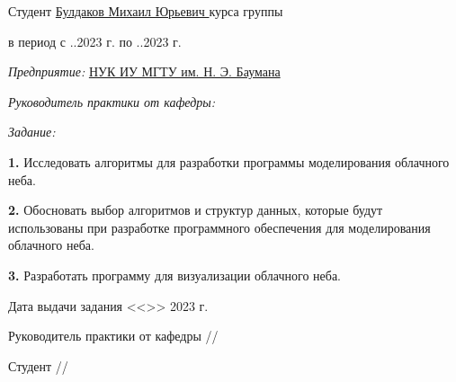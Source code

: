 \fontsize{14pt}{14pt}\selectfont

\noindent Студент \uline{\hfill Булдаков Михаил Юрьевич \hfill}  курса группы 

\vspace{0.3cm}

\noindent в период с ..2023 г. по ..2023 г.

\vspace{0.3cm}

\noindent \textit{Предприятие:} \uline{\hfill НУК ИУ МГТУ им. Н. Э. Баумана \hfill}

\vspace{0.3cm}






\noindent \textit{Руководитель практики от кафедры:}

\noindent {}

\vspace{0.3cm}

\noindent \textit{Задание:}

\noindent \textbf{1.} Исследовать алгоритмы для разработки программы моделирования облачного неба.

\noindent \textbf{2.} Обосновать выбор алгоритмов и структур данных, которые будут использованы при разработке программного обеспечения для моделирования облачного неба.

\noindent \textbf{3.} Разработать программу для визуализации облачного неба.

\vfill

\noindent Дата выдачи задания <<>> 2023 г.

\vspace{1cm}



\noindent Руководитель практики от кафедры \hfill \ulinetext[2cm]{}{}//

\vspace{0.3cm}

\noindent Студент \hfill \ulinetext[2cm]{}{}//

\vfill

